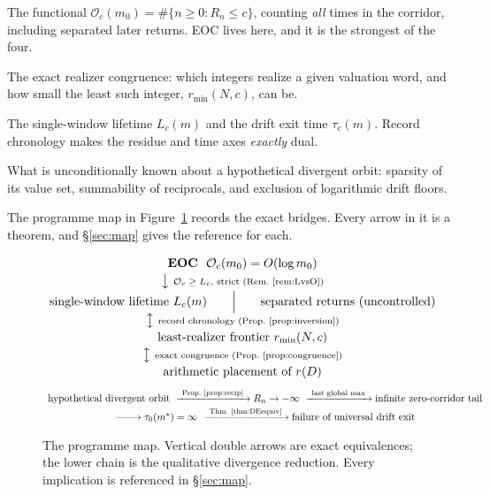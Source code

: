 \documentclass[11pt]{article}
\theoremstyle{plain}
\theoremstyle{definition}
\theoremstyle{remark}
\newcommand{\Occ}{\mathcal{O}}
\newcommand{\rmin}{r_{\min}}
\begin{document}
\begin{description}[leftmargin=2.2em,style=nextline]
\item[Occupation axis (\S\ref{sec:occupation})] The functional $\Occ_c(m_0)=\#\{n\ge 0:R_n\le c\}$,
  counting \emph{all} times in the corridor, including separated later returns. EOC lives here, and
  it is the strongest of the four.
\item[Residue axis (\S\ref{sec:residue})] The exact realizer congruence: which integers realize a
  given valuation word, and how small the least such integer, $\rmin(N,c)$, can be.
\item[Time axis (\S\ref{sec:time})] The single-window lifetime $L_c(m)$ and the drift exit time
  $\tau_c(m)$. Record chronology makes the residue and time axes \emph{exactly} dual.
\item[Divergence axis (\S\ref{sec:divergence})] What is unconditionally known about a hypothetical
  divergent orbit: sparsity of its value set, summability of reciprocals, and exclusion of
  logarithmic drift floors.
\end{description}

\noindent The programme map in Figure~\ref{fig:map} records the exact bridges. Every arrow in it is
a theorem, and \S\ref{sec:map} gives the reference for each.

\begin{figure}[t]
\centering
\begin{minipage}{0.92\textwidth}
\small
\[
\begin{array}{c}
\textbf{EOC}\ \ \Occ_c(m_0)=O(\log m_0)\\[2pt]
\big\downarrow\ \text{\scriptsize$\Occ_c\ge L_c$, strict (Rem.~\ref{rem:LvsO})}\\[2pt]
\text{single-window lifetime } L_c(m)
\qquad\Big|\qquad
\text{separated returns (uncontrolled)}\\[2pt]
\big\updownarrow\ \text{\scriptsize record chronology (Prop.~\ref{prop:inversion})}\\[2pt]
\text{least-realizer frontier } \rmin(N,c)\\[2pt]
\big\updownarrow\ \text{\scriptsize exact congruence (Prop.~\ref{prop:congruence})}\\[2pt]
\text{arithmetic placement of } r(D)
\end{array}
\]
\[
\begin{array}{c}
\text{hypothetical divergent orbit}
\ \xrightarrow{\ \text{Prop.~\ref{prop:recip}}\ } R_n\to-\infty
\ \xrightarrow{\ \text{last global max}\ } \text{infinite zero-corridor tail}\\[2pt]
\xrightarrow{\qquad} \tau_0(m^*)=\infty
\ \xrightarrow{\ \text{Thm.~\ref{thm:DEequiv}}\ }
\text{failure of universal drift exit}
\end{array}
\]
\end{minipage}
\caption{The programme map. Vertical double arrows are exact equivalences; the lower chain is the
qualitative divergence reduction. Every implication is referenced in \S\ref{sec:map}.}
\label{fig:map}
\end{figure}
\end{document}
